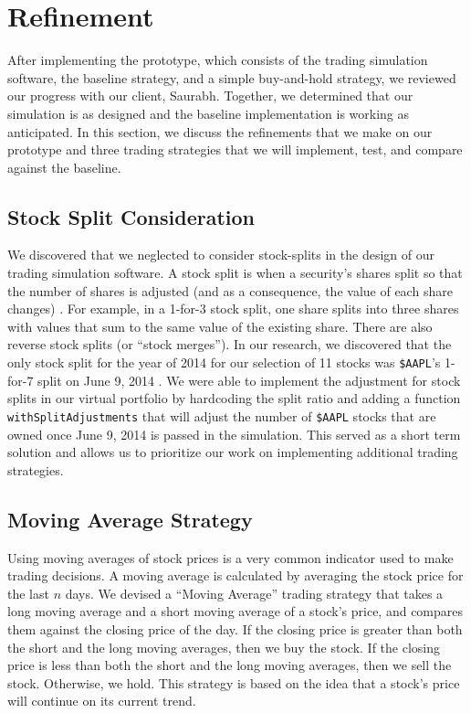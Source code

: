 
\section{Refinement}\label{refinement}

After implementing the prototype, which consists of the trading simulation software, the baseline strategy, and a simple buy-and-hold strategy, we reviewed our progress with our client, Saurabh.
Together, we determined that our simulation is as designed and the baseline implementation is working as anticipated.
In this section, we discuss the refinements that we make on our prototype and three trading strategies that we will implement, test, and compare against the baseline.

\subsection{Stock Split Consideration}

We discovered that we neglected to consider stock-splits in the design of our trading simulation software.
A stock split is when a security's shares split so that the number of shares is adjusted (and as a consequence, the value of each share changes) \cite{stocksplit}.
For example, in a 1-for-3 stock split, one share splits into three shares with values that sum to the same value of the existing share.
There are also reverse stock splits (or ``stock merges'').
In our research, we discovered that the only stock split for the year of 2014 for our selection of 11 stocks was \texttt{\$AAPL}'s 1-for-7 split on June 9, 2014 \cite{appleSplit}.
We were able to implement the adjustment for stock splits in our virtual portfolio by hardcoding the split ratio and adding a function \texttt{withSplitAdjustments} that will adjust the number of \texttt{\$AAPL} stocks that are owned once June 9, 2014 is passed in the simulation.
This served as a short term solution and allows us to prioritize our work on implementing additional trading strategies.

\subsection{Moving Average Strategy}

Using moving averages of stock prices is a very common indicator used to make trading decisions.
A moving average is calculated by averaging the stock price for the last $n$ days.
We devised a ``Moving Average'' trading strategy that takes a long moving average and a short moving average of a stock's price, and compares them against the closing price of the day.
If the closing price is greater than both the short and the long moving averages, then we buy the stock.
If the closing price is less than both the short and the long moving averages, then we sell the stock.
Otherwise, we hold.
This strategy is based on the idea that a stock's price will continue on its current trend.

